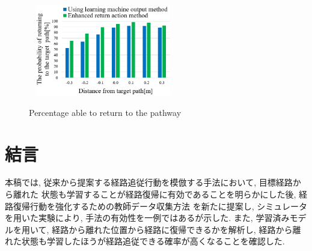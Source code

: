 \documentclass{jarticle}
\begin{document}
\begin{figure}[h!]\
  \centering
   \includegraphics[height=40mm]{./figs/kaiseki2-2.png}
   \caption{Percentage able to return to the pathway}
\end{figure}


\section{結言}
本稿では, 従来から提案する経路追従行動を模倣する手法において, 目標経路から離れた
状態も学習することが経路復帰に有効であることを明らかにした後, 経路復帰行動を強化するための教師データ収集方法
を新たに提案し, シミュレータを用いた実験により, 手法の有効性を一例ではあるが示した.
また, 学習済みモデルを用いて, 経路から離れた位置から経路に復帰できるかを解析し,
経路から離れた状態も学習したほうが経路追従できる確率が高くなることを確認した.
\vspace*{4mm}
\end{document}
